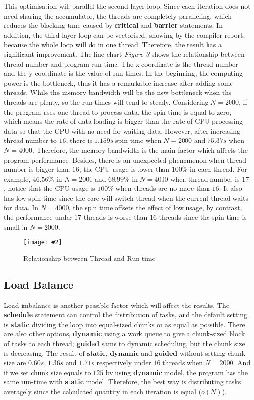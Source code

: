 \documentclass[10pt, a4paper]{article}
\newcommand{\figuremacro}[5]{
    \begin{figure}[#1]
        \centering
        \texttt{[image: \#2]}
        \caption[#3]{\textbf{#3}#4}
        \label{fig:#2}
    \end{figure}
}
\begin{document}
    This optimisation will parallel the second layer loop. Since each iteration does not need sharing the accumulator, the threads are completely paralleling, which reduces the blocking time caused by \textbf{critical} and \textbf{barrier} statements. In addition, the third layer loop can be vectorised, showing by the compiler report, because the whole loop will do in one thread. Therefore, the result has a significant improvement. The line chart \textit{Figure-3} shows the relationship between thread number and program run-time. The x-coordinate is the thread number and the y-coordinate is the value of run-times. In the beginning, the computing power is the bottleneck, thus it has a remarkable increase after adding some threads. While the memory bandwidth will be the new bottleneck when the threads are plenty, so the run-times will tend to steady. Considering $N=2000$, if the program uses one thread to process data, the spin time is equal to zero, which means the rate of data loading is bigger than the rate of CPU processing data so that the CPU with no need for waiting data. However, after increasing thread number to $16$, there is $1.159s$ spin time when $N=2000$ and $75.37s$ when $N=4000$. Therefore, the memory bandwidth is the main factor which affects the program performance. Besides, there is an unexpected phenomenon when thread number is bigger than $16$, the CPU usage is lower than $100\%$ in each thread. For example, $46.56\%$ in $N=2000$ and $68.99\%$ in $N=4000$ when thread number is $17$, notice that the CPU usage is $100\%$ when threads are no more than $16$. It also has low spin time since the core will switch thread when the current thread waits for data. In $N=4000$, the spin time offsets the effect of low usage, by contrast, the performance under $17$ threads is worse than $16$ threads since the spin time is small in $N=2000$.
	
	
	\figuremacro{h}{figure3}{}{ Relationship between Thread and Run-time }{1.0}
	
	
    \subsection{Load Balance}
	
    Load imbalance is another possible factor which will affect the results. The \textbf{schedule} statement can control the distribution of tasks, and the default setting is \textbf{static} dividing the loop into equal-sized chunks or as equal as possible. There are also other options, \textbf{dynamic} using a work queue to give a chunk-sized block of tasks to each thread; \textbf{guided} same to dynamic scheduling, but the chunk size is decreasing. The result of \textbf{static}, \textbf{dynamic} and \textbf{guided} without setting chunk size are $0.60s$, $1.36s$ and $1.71s$ respectively under $16$ threads when $N=2000$. And if we set chunk size equals to $125$ by using \textbf{dynamic} model, the program has the same run-time with \textbf{static} model. Therefore, the best way is distributing tasks averagely since the calculated quantity in each iteration is equal ($o(N)$).
	
\end{document}
